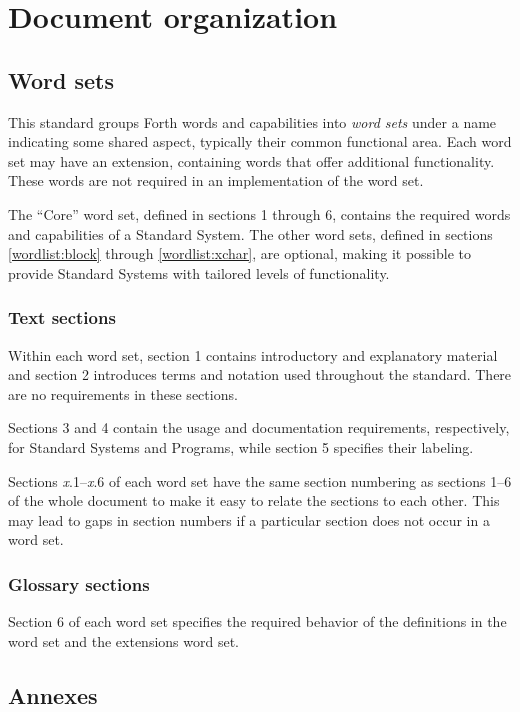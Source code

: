 \section{Document organization}
\label{intro:wordsets}

\subsection{Word sets}
This standard groups Forth words and capabilities into \emph{word sets}
under a name indicating some shared aspect, typically their common
functional area. Each word set may have an extension, containing words
that offer additional functionality. These words are not required in an
implementation of the word set.

The ``Core'' word set, defined in sections 1 through 6, contains the
required words and capabilities of a Standard System. The other word
sets, defined in sections \ref{wordlist:block} through
\ref{wordlist:xchar}, are optional, making it possible to provide
Standard Systems with tailored levels of functionality.

\subsubsection{Text sections}
\label{intro:numbering}

Within each word set, section 1 contains introductory and explanatory
material and section 2 introduces terms and notation used throughout
the standard. There are no requirements in these sections.

Sections 3 and 4 contain the usage and documentation requirements,
respectively, for Standard Systems and Programs, while section 5
specifies their labeling.

Sections \emph{x}.1--\emph{x}.6 of each word set have the same section
numbering as sections 1--6 of the whole document to make it easy to
relate the sections to each other.  This may lead to gaps in section
numbers if a particular section does not occur in a word set.

\subsubsection{Glossary sections}

Section 6 of each word set specifies the required behavior of the
definitions in the word set and the extensions word set.

\subsection{Annexes}
\label{intro:annex}


